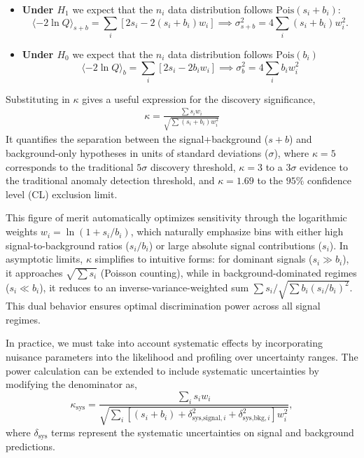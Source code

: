 \begin{itemize}
	\item \textbf{Under $H_1$} we expect that the $n_i$ data distribution follows $\text{Pois}(s_i + b_i)$:
	\begin{equation}
	\langle -2\ln Q \rangle_{s+b} = \sum_i \left[2s_i - 2(s_i + b_i)w_i\right]
	\implies \sigma^2_{s+b} = 4\sum_i (s_i + b_i) w_i^2.
	\end{equation}

	\item \textbf{Under $H_0$} we expect that the $n_i$ data distribution follows $\text{Pois}(b_i)$
	\begin{equation}
	\langle -2\ln Q \rangle_{b} = \sum_i \left[2s_i - 2b_i w_i\right]
	\implies \sigma^2_{b} = 4\sum_i b_i w_i^2
	\end{equation}
\end{itemize}
Substituting in $\kappa$ gives a useful expression for the discovery significance,
\begin{align}
\kappa = \frac{\sum s_i w_i}{\sqrt{\sum (s_i + b_i) w_i^2}}
\end{align}
It quantifies the separation between the signal+background ($s+b$) and background-only hypotheses in units of standard deviations ($\sigma$), where $\kappa = 5$ corresponds to the traditional $5\sigma$ discovery threshold, $\kappa =3$ to a $3\sigma$ evidence to the traditional anomaly detection threshold, and $\kappa = 1.69$ to the $95\%$ confidence level (CL) exclusion limit.


This figure of merit automatically optimizes sensitivity through the logarithmic weights $w_i = \ln(1 + s_i/b_i)$, which naturally emphasize bins with either high signal-to-background ratios ($s_i/b_i$) or large absolute signal contributions ($s_i$). In asymptotic limits, $\kappa$ simplifies to intuitive forms: for dominant signals ($s_i \gg b_i$), it approaches $\sqrt{\sum s_i}$ (Poisson counting), while in background-dominated regimes ($s_i \ll b_i$), it reduces to an inverse-variance-weighted sum $\sum s_i / \sqrt{\sum b_i (s_i/b_i)^2}$. This dual behavior ensures optimal discrimination power across all signal regimes.

In practice, we must take into account systematic effects by incorporating nuisance parameters into the likelihood and profiling over uncertainty ranges. The power calculation can be extended to include systematic uncertainties by modifying the denominator as,
\begin{equation}
	\boxed{
	\kappa_{\text{sys}} = \frac{\sum_i s_i w_i}{\sqrt{\sum_i \left[(s_i + b_i) + \delta^2_{\text{sys,signal},i} + \delta^2_{\text{sys,bkg},i}\right] w_i^2}},
}
\label{eq:kappa_with_systematics}
\end{equation}
where $\delta_{\text{sys}}$ terms represent the systematic uncertainties on signal and background predictions.

